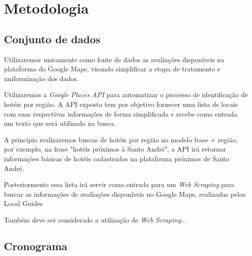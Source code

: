 \chapter{Metodologia}
\label{cap:metodologia}


\section{Conjunto de dados}

Utilizaremos unicamente como fonte de dados as avaliações disponíveis na plataforma do Google Maps, visando simplificar a etapa de tratamento e uniformização dos dados.

Utilizaremos a \emph{Google Places API} para automatizar o processo de identificação de hotéis por região. A API exposta tem por objetivo fornecer uma lista de locais com suas respectivas informações de forma simplificada e recebe como entrada um texto que será utilizado na busca.

A princípio realizaremos buscas de hotéis por região no modelo frase + região, por exemplo, na frase "hotéis próximos à Santo André", a API irá retornar informações básicas de hotéis cadastrados na plataforma próximos de Santo André.

Posteriormente essa lista irá servir como entrada para um \emph{Web Scraping} para buscar as informações de avaliações disponíveis no Google Maps, realizadas pelos Local Guides\cite{google2022localguides}

Também deve ser considerado a utilização de \emph{Web Scraping}...

\section{Cronograma}
